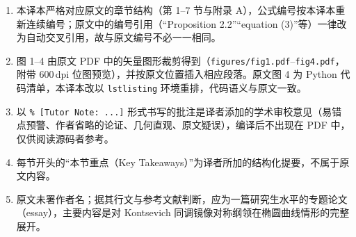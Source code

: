 \documentclass[11pt,a4paper,UTF8]{article}
\begin{document}
\begin{enumerate}[leftmargin=1.6em, itemsep=2pt]
  \item 本译本严格对应原文的章节结构（第 1–7 节与附录 A），公式编号按本译本重新连续编号；原文中的编号引用（“Proposition 2.2”“equation (3)”等）一律改为自动交叉引用，故与原文编号不必一一相同。
  \item 图 1–4 由原文 PDF 中的矢量图形裁剪得到（\texttt{figures/fig1.pdf}–\texttt{fig4.pdf}，附带 600\,dpi 位图预览），并按原文位置插入相应段落。原文图 4 为 Python 代码清单，本译本改以 \texttt{lstlisting} 环境重排，代码语义与原文一致。
  \item 以 \texttt{\% [Tutor Note: ...]} 形式书写的批注是译者添加的学术审校意见（易错点预警、作者省略的论证、几何直观、原文疑误），编译后不出现在 PDF 中，仅供阅读源码者参考。
  \item 每节开头的“本节重点（Key Takeaways）”为译者所加的结构化提要，不属于原文内容。
  \item 原文未署作者名；据其行文与参考文献判断，应为一篇研究生水平的专题论文（essay），主要内容是对 Kontsevich 同调镜像对称纲领在椭圆曲线情形的完整展开。
\end{enumerate}

\newpage
\tableofcontents

\newpage
{}




\appendix

\end{document}
